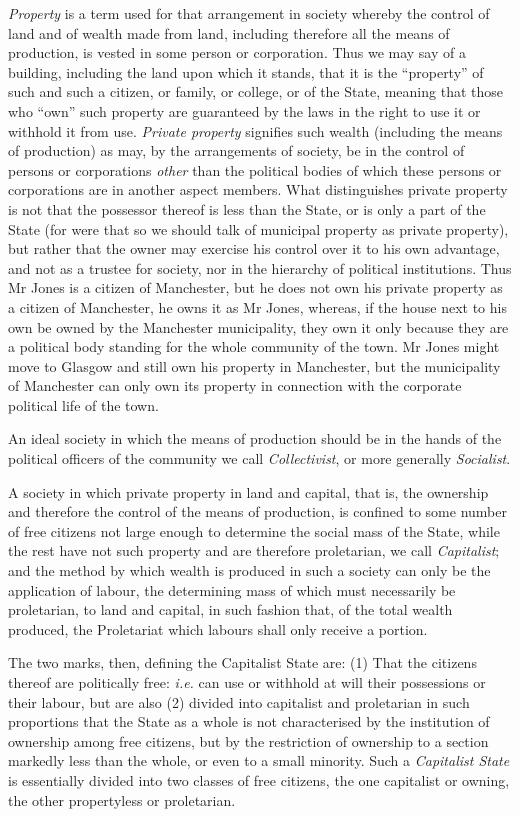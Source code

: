 \documentclass{book}
\begin{document}
\emph{Property} is a term used for that arrangement in society whereby the control of land and of wealth made from land, including therefore all the means of production, is vested in some person or corporation. Thus we may say of a building, including the land upon which it stands, that it is the “property” of such and such a citizen, or family, or college, or of the State, meaning that those who “own” such property are guaranteed by the laws in the right to use it or withhold it from use. \emph{Private property} signifies such wealth (including the means of production) as may, by the arrangements of society, be in the control of persons or corporations \emph{other} than the political bodies of which these persons or corporations are in another aspect members. What distinguishes private property is not that the possessor thereof is less than the State, or is only a part of the State (for were that so we should talk of municipal property as private property), but rather that the owner may exercise his control over it to his own advantage, and not as a trustee for society, nor in the hierarchy of political institutions. Thus Mr Jones is a citizen of Manchester, but he does not own his private property as a citizen of Manchester, he owns it as Mr Jones, whereas, if the house next to his own be owned by the Manchester municipality, they own it only because they are a political body standing for the whole community of the town. Mr Jones might move to Glasgow and still own his property in Manchester, but the municipality of Manchester can only own its property in connection with the corporate political life of the town.

An ideal society in which the means of production should be in the hands of the political officers of the community we call \emph{Collectivist}, or more generally \emph{Socialist}.\footnotemark[1]

A society in which private property in land and capital, that is, the ownership and therefore the control of the means of production, is confined to some number of free citizens not large enough to determine the social mass of the State, while the rest have not such property and are therefore proletarian, we call \emph{Capitalist}; and the method by which wealth is produced in such a society can only be the application of labour, the determining mass of which must necessarily be proletarian, to land and capital, in such fashion that, of the total wealth produced, the Proletariat which labours shall only receive a portion.

The two marks, then, defining the Capitalist State are: (1) That the citizens thereof are politically free: \emph{i.e.} can use or withhold at will their possessions or their labour, but are also (2) divided into capitalist and proletarian in such proportions that the State as a whole is not characterised by the institution of ownership among free citizens, but by the restriction of ownership to a section markedly less than the whole, or even to a small minority. Such a \emph{Capitalist State} is essentially divided into two classes of free citizens, the one capitalist or owning, the other propertyless or proletarian.
\end{document}
